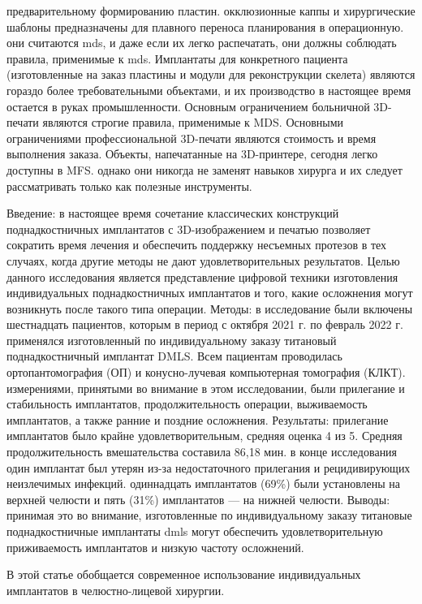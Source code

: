 предварительному формированию пластин. окклюзионные каппы и хирургические
шаблоны предназначены для плавного переноса планирования в операционную. они
считаются mds, и даже если их легко распечатать, они должны соблюдать правила,
применимые к mds. Имплантаты для конкретного пациента (изготовленные на заказ
пластины и модули для реконструкции скелета) являются гораздо более
требовательными объектами, и их производство в настоящее время остается в
руках промышленности. Основным ограничением больничной 3D-печати являются
строгие правила, применимые к MDS. Основными ограничениями профессиональной
3D-печати являются стоимость и время выполнения заказа. Объекты, напечатанные
на 3D-принтере, сегодня легко доступны в MFS. однако они никогда не заменят
навыков хирурга и их следует рассматривать только как полезные
инструменты.\cite{louvrier2017}

Введение: в настоящее время сочетание классических конструкций поднадкостничных
имплантатов с 3D-изображением и печатью позволяет сократить время лечения и
обеспечить поддержку несъемных протезов в тех случаях, когда другие методы не
дают удовлетворительных результатов. Целью данного исследования является
представление цифровой техники изготовления индивидуальных поднадкостничных
имплантатов и того, какие осложнения могут возникнуть после такого типа
операции. Методы: в исследование были включены шестнадцать пациентов, которым в
период с октября 2021 г. по февраль 2022 г. применялся изготовленный по
индивидуальному заказу титановый поднадкостничный имплантат DMLS. Всем пациентам
проводилась ортопантомография (ОП) и конусно-лучевая компьютерная томография
(КЛКТ). измерениями, принятыми во внимание в этом исследовании, были прилегание
и стабильность имплантатов, продолжительность операции, выживаемость
имплантатов, а также ранние и поздние осложнения. Результаты: прилегание
имплантатов было крайне удовлетворительным, средняя оценка 4 из 5. Средняя
продолжительность вмешательства составила 86,18 мин. в конце исследования один
имплантат был утерян из-за недостаточного прилегания и рецидивирующих
неизлечимых инфекций. одиннадцать имплантатов (69\%) были установлены на верхней
челюсти и пять (31\%) имплантатов — на нижней челюсти. Выводы: принимая это во
внимание, изготовленные по индивидуальному заказу титановые поднадкостничные
имплантаты dmls могут обеспечить удовлетворительную приживаемость
имплантатов и низкую частоту осложнений.\cite{alexandru2022}

В этой статье обобщается современное использование индивидуальных имплантатов в
челюстно-лицевой хирургии.\cite{huang2019}

